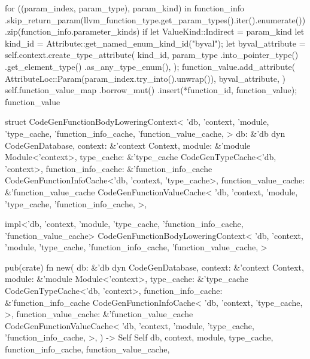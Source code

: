 \documentclass[
  oneside,
  english,
  coorientadorbanca,
  noabntexcite
]{ufsc-thesis-rn46-2019}
\begin{document}
\begin{rustcode}
{{        for ((param_index, param_type), param_kind) in function_info
            .skip_return_param(llvm_function_type.get_param_types().iter().enumerate())
            .zip(function_info.parameter_kinds)
        {
            if let ValueKind::Indirect = param_kind {
                let kind_id = Attribute::get_named_enum_kind_id("byval");
                let byval_attribute = self.context.create_type_attribute(
                    kind_id,
                    param_type
                        .into_pointer_type()
                        .get_element_type()
                        .as_any_type_enum(),
                );
                function_value.add_attribute(
                    AttributeLoc::Param(param_index.try_into().unwrap()),
                    byval_attribute,
                )
            }
        }
        self.function_value_map
            .borrow_mut()
            .insert(*function_id, function_value);
        function_value
    }
}

struct CodeGenFunctionBodyLoweringContext<
    'db,
    'context,
    'module,
    'type_cache,
    'function_info_cache,
    'function_value_cache,
> {
    db: &'db dyn CodeGenDatabase,
    context: &'context Context,
    module: &'module Module<'context>,
    type_cache: &'type_cache CodeGenTypeCache<'db, 'context>,
    function_info_cache: &'function_info_cache CodeGenFunctionInfoCache<'db, 'context, 'type_cache>,
    function_value_cache: &'function_value_cache CodeGenFunctionValueCache<
        'db,
        'context,
        'module,
        'type_cache,
        'function_info_cache,
    >,
}

impl<'db, 'context, 'module, 'type_cache, 'function_info_cache, 'function_value_cache>
    CodeGenFunctionBodyLoweringContext<
        'db,
        'context,
        'module,
        'type_cache,
        'function_info_cache,
        'function_value_cache,
    >
{
    pub(crate) fn new(
        db: &'db dyn CodeGenDatabase,
        context: &'context Context,
        module: &'module Module<'context>,
        type_cache: &'type_cache CodeGenTypeCache<'db, 'context>,
        function_info_cache: &'function_info_cache CodeGenFunctionInfoCache<
            'db,
            'context,
            'type_cache,
        >,
        function_value_cache: &'function_value_cache CodeGenFunctionValueCache<
            'db,
            'context,
            'module,
            'type_cache,
            'function_info_cache,
        >,
    ) -> Self {
        Self {
            db,
            context,
            module,
            type_cache,
            function_info_cache,
            function_value_cache,
        }
    }

}
\end{rustcode}
\end{document}
